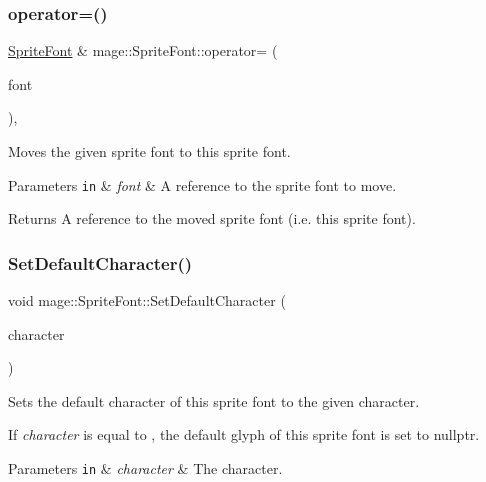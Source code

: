\subsubsection{\texorpdfstring{operator=()}{operator=()}\hspace{0.1cm}{\footnotesize\ttfamily [2/2]}}
{\footnotesize\ttfamily \hyperlink{classmage_1_1_sprite_font}{Sprite\+Font} \& mage\+::\+Sprite\+Font\+::operator= (\begin{DoxyParamCaption}\item[{\hyperlink{classmage_1_1_sprite_font}{Sprite\+Font} \&\&}]{font }\end{DoxyParamCaption})\hspace{0.3cm}{\ttfamily [default]}, {\ttfamily [noexcept]}}

Moves the given sprite font to this sprite font.


\begin{DoxyParams}[1]{Parameters}
\mbox{\tt in}  & {\em font} & A reference to the sprite font to move. \\
\hline
\end{DoxyParams}
\begin{DoxyReturn}{Returns}
A reference to the moved sprite font (i.\+e. this sprite font). 
\end{DoxyReturn}
\hypertarget{classmage_1_1_sprite_font_a0b0feb25673d6f9d9e3215167800d817}{}\label{classmage_1_1_sprite_font_a0b0feb25673d6f9d9e3215167800d817} 
\subsubsection{\texorpdfstring{Set\+Default\+Character()}{SetDefaultCharacter()}}
{\footnotesize\ttfamily void mage\+::\+Sprite\+Font\+::\+Set\+Default\+Character (\begin{DoxyParamCaption}\item[{wchar\+\_\+t}]{character }\end{DoxyParamCaption})}

Sets the default character of this sprite font to the given character.

If {\itshape character} is equal to {}, the default glyph of this sprite font is set to {\ttfamily nullptr}.


\begin{DoxyParams}[1]{Parameters}
\mbox{\tt in}  & {\em character} & The character. \\
\hline
\end{DoxyParams}

